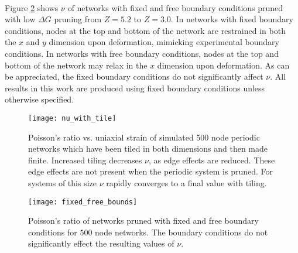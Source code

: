 \documentclass[9pt,twocolumn,twoside]{pnas-new}
\begin{document}
\paragraph{}
Figure \ref{fig:fixed_free_bounds} shows $\nu$ of networks with fixed and free boundary conditions pruned with low $\Delta G$ pruning from $Z=5.2$ to $Z=3.0$.  In networks with fixed boundary conditions, nodes at the top and bottom of the network are restrained in both the $x$ and $y$ dimension upon deformation, mimicking experimental boundary conditions.  In networks with free boundary conditions, nodes at the top and bottom of the network may relax in the $x$ dimension upon deformation. As can be appreciated, the fixed boundary conditions do not significantly affect $\nu$. All results in this work are produced using fixed boundary conditions unless otherwise specified.   



\begin{figure}
	\centering
	\texttt{[image: nu\_with\_tile]}
	\caption{Poisson's ratio vs. uniaxial strain of simulated 500 node periodic networks which have been tiled in both dimensions and then made finite.  Increased tiling decreases $\nu$, as edge effects are reduced.  These edge effects are not present when the periodic system is pruned.  For systems of this  size $\nu$ rapidly converges to a final value with tiling.}
	\label{fig:nu_with_tile}
\end{figure}

  \begin{figure}
	\centering
	\texttt{[image: fixed\_free\_bounds]}
	\caption{Poisson's ratio of networks pruned with fixed and free boundary conditions for $500$ node networks.  The boundary conditions do not significantly effect the resulting values of $\nu$.  }
	\label{fig:fixed_free_bounds}
\end{figure}
\end{document}
